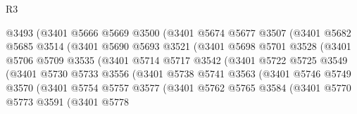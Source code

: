 \begin{lexlean}{R3}
\begin{coremodule}
                        @3493
                        (@3401
                          @5666
                          @5669
                          @3500
                          (@3401
                            @5674
                            @5677
                            @3507
                            (@3401
                              @5682
                              @5685
                              @3514
                              (@3401
                                @5690
                                @5693
                                @3521
                                (@3401
                                  @5698
                                  @5701
                                  @3528
                                  (@3401
                                    @5706
                                    @5709
                                    @3535
                                    (@3401
                                      @5714
                                      @5717
                                      @3542
                                      (@3401
                                        @5722
                                        @5725
                                        @3549
                                        (@3401
                                          @5730
                                          @5733
                                          @3556
                                          (@3401
                                            @5738
                                            @5741
                                            @3563
                                            (@3401
                                              @5746
                                              @5749
                                              @3570
                                              (@3401
                                                @5754
                                                @5757
                                                @3577
                                                (@3401
                                                  @5762
                                                  @5765
                                                  @3584
                                                  (@3401
                                                    @5770
                                                    @5773
                                                    @3591
                                                    (@3401
                                                      @5778

\end{coremodule}
\end{lexlean}
